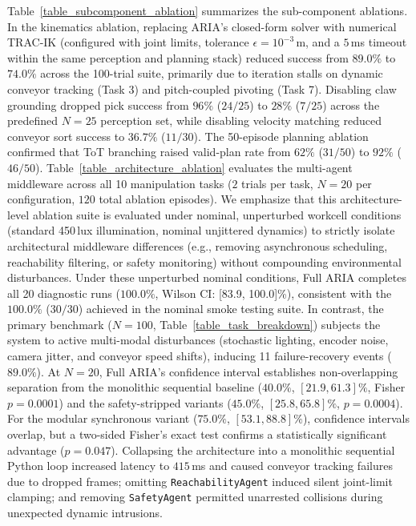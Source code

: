 \documentclass[journal]{IEEEtran}
\begin{document}
Table~\ref{table_subcomponent_ablation} summarizes the sub-component ablations. In the kinematics ablation, replacing ARIA's closed-form solver with numerical TRAC-IK (configured with joint limits, tolerance $\epsilon = 10^{-3}$\,m, and a $5$\,ms timeout within the same perception and planning stack) reduced success from $89.0\%$ to $74.0\%$ across the 100-trial suite, primarily due to iteration stalls on dynamic conveyor tracking (Task 3) and pitch-coupled pivoting (Task 7). Disabling claw grounding dropped pick success from $96\%$ ($24/25$) to $28\%$ ($7/25$) across the predefined $N=25$ perception set, while disabling velocity matching reduced conveyor sort success to $36.7\%$ ($11/30$). The 50-episode planning ablation confirmed that ToT branching raised valid-plan rate from $62\%$ ($31/50$) to $92\%$ ($46/50$). Table~\ref{table_architecture_ablation} evaluates the multi-agent middleware across all 10 manipulation tasks ($2$ trials per task, $N=20$ per configuration, $120$ total ablation episodes). We emphasize that this architecture-level ablation suite is evaluated under nominal, unperturbed workcell conditions (standard 450\,lux illumination, nominal unjittered dynamics) to strictly isolate architectural middleware differences (e.g., removing asynchronous scheduling, reachability filtering, or safety monitoring) without compounding environmental disturbances. Under these unperturbed nominal conditions, Full ARIA completes all 20 diagnostic runs ($100.0\%$, Wilson CI: [83.9, 100.0]\%), consistent with the $100.0\%$ ($30/30$) achieved in the nominal smoke testing suite. In contrast, the primary benchmark ($N=100$, Table~\ref{table_task_breakdown}) subjects the system to active multi-modal disturbances (stochastic lighting, encoder noise, camera jitter, and conveyor speed shifts), inducing 11 failure-recovery events ($89.0\%$). At $N=20$, Full ARIA's confidence interval establishes non-overlapping separation from the monolithic sequential baseline ($40.0\%$, $[21.9, 61.3]\%$, Fisher $p = 0.0001$) and the safety-stripped variants ($45.0\%$, $[25.8, 65.8]\%$, $p = 0.0004$). For the modular synchronous variant ($75.0\%$, $[53.1, 88.8]\%$), confidence intervals overlap, but a two-sided Fisher's exact test confirms a statistically significant advantage ($p = 0.047$). Collapsing the architecture into a monolithic sequential Python loop increased latency to $415$\,ms and caused conveyor tracking failures due to dropped frames; omitting \texttt{ReachabilityAgent} induced silent joint-limit clamping; and removing \texttt{SafetyAgent} permitted unarrested collisions during unexpected dynamic intrusions.
\end{document}
